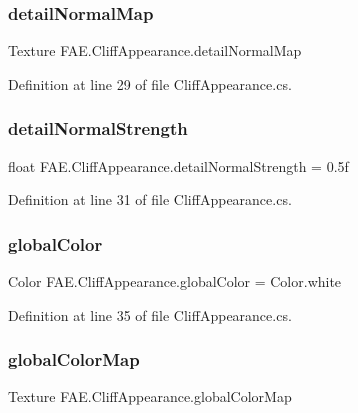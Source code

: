 \subsubsection{detail\+Normal\+Map}
{\footnotesize\ttfamily Texture F\+A\+E.\+Cliff\+Appearance.\+detail\+Normal\+Map}



Definition at line 29 of file Cliff\+Appearance.\+cs.

\mbox{\label{class_f_a_e_1_1_cliff_appearance_a7ba65efaf1fbdffee12b5ce7ab384cfa}} 
\subsubsection{detail\+Normal\+Strength}
{\footnotesize\ttfamily float F\+A\+E.\+Cliff\+Appearance.\+detail\+Normal\+Strength = 0.\+5f}



Definition at line 31 of file Cliff\+Appearance.\+cs.

\mbox{\label{class_f_a_e_1_1_cliff_appearance_a146b2dc624770ef99f267f39891f982c}} 
\subsubsection{global\+Color}
{\footnotesize\ttfamily Color F\+A\+E.\+Cliff\+Appearance.\+global\+Color = Color.\+white}



Definition at line 35 of file Cliff\+Appearance.\+cs.

\mbox{\label{class_f_a_e_1_1_cliff_appearance_a5defb223987fb1e8c1924efb80e9de31}} 
\subsubsection{global\+Color\+Map}
{\footnotesize\ttfamily Texture F\+A\+E.\+Cliff\+Appearance.\+global\+Color\+Map}



